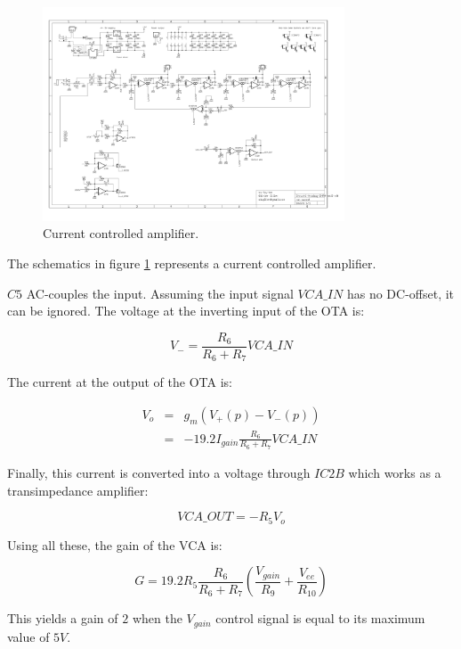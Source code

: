 \documentclass[a4paper,11pt]{article}
\begin{document}
\begin{figure}
\centering
\includegraphics[width=0.8\textwidth]{smr4mkII_vca.pdf}
\caption{Current controlled amplifier.}
\label{fig:vca}
\end{figure}

The schematics in figure \ref{fig:vca} represents a current controlled amplifier.

$C5$ AC-couples the input. Assuming the input signal $VCA\_IN$ has no DC-offset, it can be ignored. The voltage at the inverting input of the OTA is:

\begin{equation}
V_- = \frac{R_6}{R_6 + R_7} VCA\_IN
\end{equation}

The current at the output of the OTA is:

\begin{eqnarray}
V_o &=& g_m (V_+(p) - V_-(p)) \\
 &=& -19.2 I_{gain} \frac{R_6}{R_6 + R_7} VCA\_IN
\end{eqnarray}

Finally, this current is converted into a voltage through $IC2B$ which works as a transimpedance amplifier:

\begin{equation}
VCA\_OUT = -R_5 V_o
\end{equation}

Using all these, the gain of the VCA is:

\begin{equation}
G = 19.2 R_5 \frac{R_6}{R_6 + R_7} \left(\frac{V_{gain}}{R_9} + \frac{V_{ee}}{R_{10}}\right)
\end{equation}

This yields a gain of $2$ when the $V_{gain}$ control signal is equal to its maximum value of $5V$.
\end{document}
